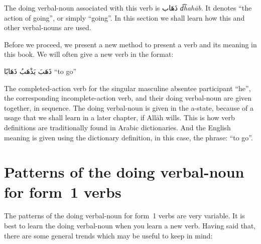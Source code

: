\documentclass[
  10pt,
]{book}
\begin{document}
The doing verbal-noun associated with this verb is \foreignlanguage{arabic}{ذَهَاب} \emph{d͡hahāb}. It denotes \enquote{the action of going}, or simply \enquote{going}. In this section we shall learn how this and other verbal-nouns are used.

Before we proceed, we present a new method to present a verb and its meaning in this book.
We will often give a new verb in the format:

\foreignlanguage{arabic}{ذَهَبَ يَذْهَبُ ذَهَابًا} \enquote{to go}

The completed-action verb for the singular masculine absentee participant \enquote{he}, the corresponding incomplete-action verb, and their doing verbal-noun are given together, in sequence. The doing verbal-noun is given in the a-state, because of a usage that we shall learn in a later chapter, if Allāh wills. This is how verb definitions are traditionally found in Arabic dictionaries. And the English meaning is given using the dictionary definition, in this case, the phrase: \enquote{to go}.

\section{Patterns of the doing verbal-noun for form~1 verbs}\label{patterns-of-the-doing-verbal-noun-for-form-1-verbs}

The patterns of the doing verbal-noun for form~1 verbs are very variable. It is best to learn the doing verbal-noun when you learn a new verb. Having said that, there are some general trends which may be useful to keep in mind:
\end{document}
